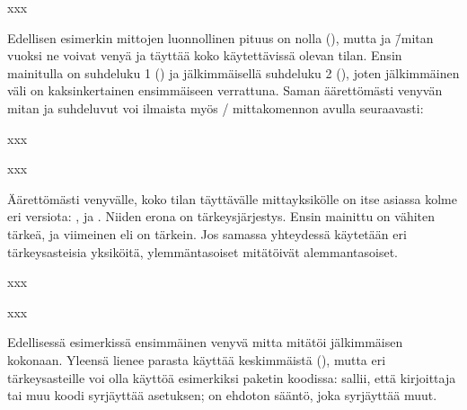 \begin{tulossis}
  x\hspace{0mm plus 1fill}x\hspace{0mm plus 2fill}x
\end{tulossis}

\noindent
Edellisen esimerkin mittojen luonnollinen pituus on nolla (\koodi{0mm}),
mutta  ja  \=/mitan vuoksi ne voivat venyä ja
täyttää koko käytettävissä olevan tilan. Ensin mainitulla on suhdeluku 1
() ja jälkimmäisellä suhdeluku 2 (), joten
jälkimmäinen väli on kaksinkertainen ensimmäiseen verrattuna. Saman
äärettömästi venyvän mitan ja suhdeluvut voi ilmaista myös
\-/ mittakomennon avulla seuraavasti:

\begin{koodilohkosis}
xxx
\end{koodilohkosis}

\begin{tulossis}
  xxx
\end{tulossis}

\noindent
Äärettömästi venyvälle, koko tilan täyttävälle mittayksikölle on itse
asiassa kolme eri versiota: ,  ja .
Niiden erona on tärkeysjärjestys. Ensin mainittu  on vähiten
tärkeä, ja viimeinen eli  on tärkein. Jos samassa
yhteydessä käytetään eri tärkeysasteisia yksiköitä, ylemmäntasoiset
mitätöivät alemmantasoiset.

\begin{koodilohkosis}
x\hspace{0mm plus 1filll}x\hspace{0mm plus 1fill}x
\end{koodilohkosis}

\begin{tulossis}
  x\hspace{0mm plus 1filll}x\hspace{0mm plus 1fill}x
\end{tulossis}

\noindent
Edellisessä esimerkissä ensimmäinen venyvä mitta  mitätöi
jälkimmäisen  kokonaan. Yleensä lienee parasta käyttää
keskimmäistä (), mutta eri tärkeysasteille voi olla käyttöä
esimerkiksi paketin koodissa:  sallii, että kirjoittaja
tai muu koodi syrjäyttää asetuksen;  on ehdoton sääntö,
joka syrjäyttää muut.

